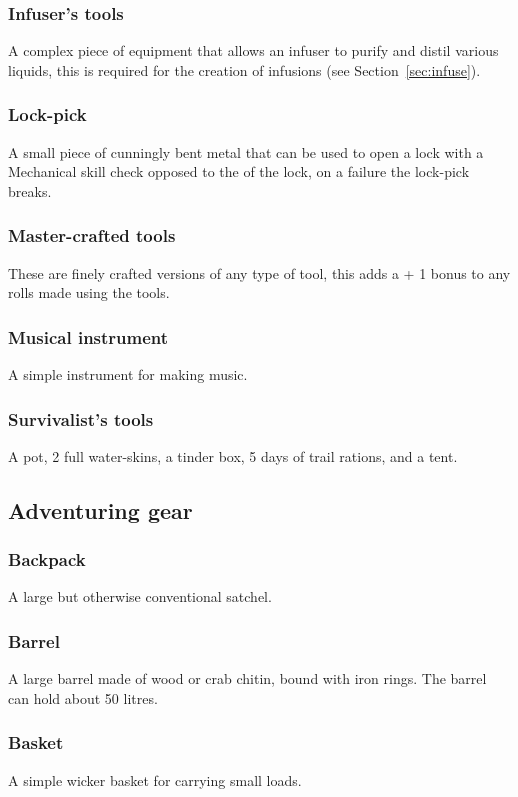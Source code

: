 \documentclass[a4paper,11pt,oneside]{book}
\newcommand{\textlf}[1]{\textbf{\titlecap{#1}}}
\begin{document}
\subsubsection{Infuser's tools}
A complex piece of equipment that allows an infuser to purify and distil various liquids, this is required for the creation of infusions (see Section~\ref{sec:infuse}).

\subsubsection{Lock-pick}
A small piece of cunningly bent metal that can be used to open a lock with a Mechanical skill check opposed to the \textlf{difficulty} of the lock, on a failure the lock-pick breaks.

\subsubsection{Master-crafted tools}
These are finely crafted versions of any type of tool, this adds a + 1 bonus to any rolls made using the tools.

\subsubsection{Musical instrument}
A simple instrument for making music.

\subsubsection{Survivalist's tools}
A pot, 2 full water-skins, a tinder box, 5 days of trail rations, and a tent.

\subsection{Adventuring gear}

\subsubsection{Backpack}
A large but otherwise conventional satchel.

\subsubsection{Barrel}
A large barrel made of wood or crab chitin, bound with iron rings. The barrel can hold about 50 litres.

\subsubsection{Basket}
A simple wicker basket for carrying small loads.
\end{document}

